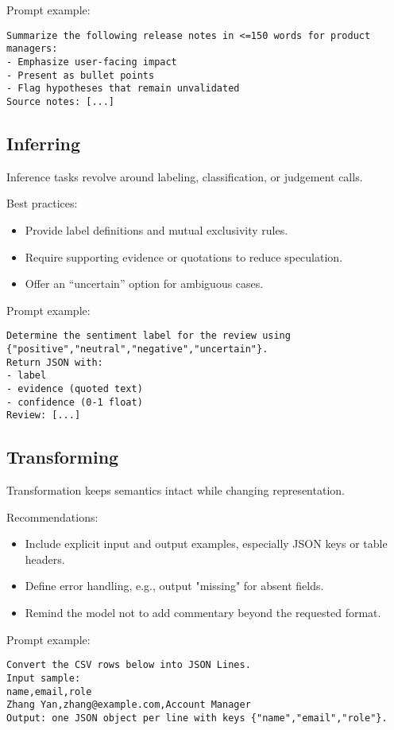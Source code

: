 ﻿\documentclass[12pt]{article}
\begin{document}
Prompt example:
\begin{verbatim}
Summarize the following release notes in <=150 words for product managers:
- Emphasize user-facing impact
- Present as bullet points
- Flag hypotheses that remain unvalidated
Source notes: [...]
\end{verbatim}

\subsection{Inferring}
Inference tasks revolve around labeling, classification, or judgement calls.

Best practices:
\begin{itemize}[leftmargin=*,itemsep=0.4em]
  \item Provide label definitions and mutual exclusivity rules.
  \item Require supporting evidence or quotations to reduce speculation.
  \item Offer an ``uncertain'' option for ambiguous cases.
\end{itemize}

Prompt example:
\begin{verbatim}
Determine the sentiment label for the review using {"positive","neutral","negative","uncertain"}.
Return JSON with:
- label
- evidence (quoted text)
- confidence (0-1 float)
Review: [...]
\end{verbatim}

\subsection{Transforming}
Transformation keeps semantics intact while changing representation.

Recommendations:
\begin{itemize}[leftmargin=*,itemsep=0.4em]
  \item Include explicit input and output examples, especially JSON keys or table headers.
  \item Define error handling, e.g., output "missing" for absent fields.
  \item Remind the model not to add commentary beyond the requested format.
\end{itemize}

Prompt example:
\begin{verbatim}
Convert the CSV rows below into JSON Lines.
Input sample:
name,email,role
Zhang Yan,zhang@example.com,Account Manager
Output: one JSON object per line with keys {"name","email","role"}.
\end{verbatim}
\end{document}

